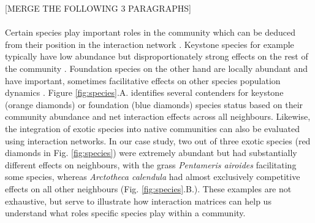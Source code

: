 \documentclass[a4,12pt]{article}
\begin{document}
    [MERGE THE FOLLOWING 3 PARAGRAPHS]

    \paragraph{}
    Certain species play important roles in the community which can be deduced from their position in the interaction network \parencite{Cirtwill2018a}. Keystone species for example typically have low abundance but disproportionately strong effects on the rest of the community \parencite{Power1996}. Foundation species on the other hand are locally abundant and have important, sometimes facilitative effects on other species population dynamics \parencite{Ellison2019}. Figure \ref{fig:species}.A. identifies several contenders for keystone (orange diamonds) or foundation (blue diamonds) species status based on their community abundance and net interaction effects across all neighbours. Likewise, the integration of exotic species into native communities can also be evaluated using interaction networks. In our case study, two out of three exotic species (red diamonds in Fig. \ref{fig:species}) were extremely abundant but had substantially different effects on neighbours, with the grass \textit{Pentameris airoides} facilitating some species, whereas \textit{Arctotheca calendula} had almost exclusively competitive effects on all other neighbours (Fig. \ref{fig:species}.B.). These examples are not exhaustive, but serve to illustrate how interaction matrices can help us understand what roles specific species play within a community. 

\end{document}
